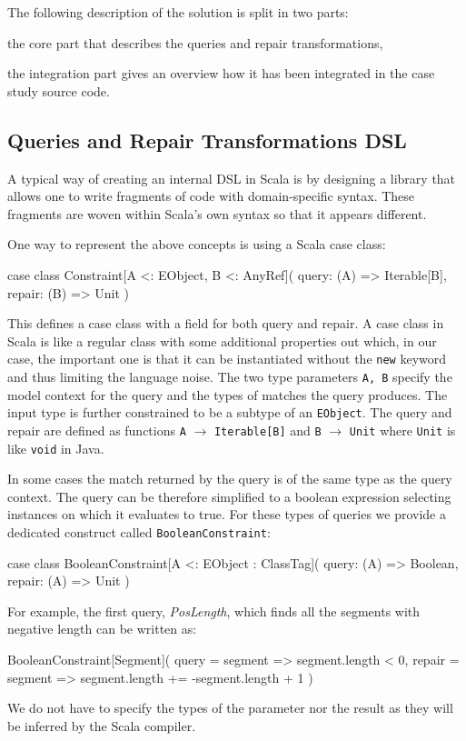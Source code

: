 The following description of the solution is split in two parts:
\begin{inparaenum}[(1)]
  \item the core part that describes the queries and repair transformations,
  \item the integration part gives an overview how it has been integrated in the case study source code.
\end{inparaenum}

\subsection{Queries and Repair Transformations DSL}

A typical way of creating an internal DSL in Scala is by designing a library that allows one to write fragments of code with domain-specific syntax.
These fragments are woven within Scala's own syntax so that it appears different.

One way to represent the above concepts is using a Scala case class:
%
\begin{scalacode}
case class Constraint[A <: EObject, B <: AnyRef](
  query: (A) => Iterable[B],
  repair: (B) => Unit
)
\end{scalacode}
%
This defines a case class with a field for both query and repair.
A case class in Scala is like a regular class with some additional properties out which, in our case, the important one is that it can be instantiated without the \texttt{new} keyword and thus limiting the language noise.
The two type parameters \texttt{A, B} specify the model context for the query and the types of matches the query produces.
The input type is further constrained to be a subtype of an \texttt{EObject}.
The query and repair are defined as functions \texttt{A} $\rightarrow$ \texttt{Iterable[B]} and \texttt{B} $\rightarrow$ \texttt{Unit} where \texttt{Unit} is like \texttt{void} in Java.

In some cases the match returned by the query is of the same type as the query context.
The query can be therefore simplified to a boolean expression selecting instances on which it evaluates to true.
For these types of queries we provide a dedicated construct called \texttt{BooleanConstraint}:
%
\begin{scalacode}
case class BooleanConstraint[A <: EObject : ClassTag](
  query: (A) => Boolean, 
  repair: (A) => Unit
)
\end{scalacode}

For example, the first query, \emph{PosLength}, which finds all the segments with negative length can be written as:
%
\begin{scalacode}
BooleanConstraint[Segment](
  query = segment => segment.length < 0,
  repair = segment => segment.length += -segment.length + 1
)
\end{scalacode}
%
We do not have to specify the types of the parameter nor the result as they will be inferred by the Scala compiler.

